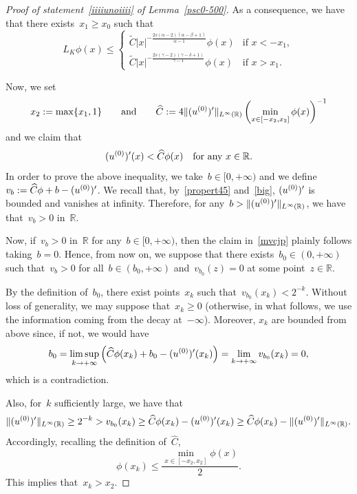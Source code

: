 \documentclass[10pt,a4paper]{amsart}
\numberwithin{equation}{section}
\newcommand{\R}{\mathbb{R}}
\begin{document}
\begin{proof}[Proof of statement~\eqref{iiiiunoiiii} of Lemma~\ref{psc0-500}]
As a consequence, we have that
there exists~$x_1\ge x_0$ such that
\begin{equation}\label{jddo}
{L}_K \phi(x) \leq \begin{cases}
\widetilde{C} |x|^{-\frac{2s(\alpha -2)(\alpha-\beta+1)}{\alpha-1}} \phi(x) &\mbox{if } x < -x_1,\\
\widetilde{C} | x|^{-\frac{2s(\gamma -2)(\gamma-\delta+1)}{\gamma-1}} \phi(x) &\mbox{if } x >x_1.
\end{cases}
\end{equation}

Now, we set 
\begin{equation*}
x_2:= \max\{ x_1,1\} \qquad\mbox{and}\qquad 
\widehat{C} :=4\Vert (u^{(0)})\rq{}\Vert_{L^{\infty}(\R)}  \left(\min_{x \in [-x_2,x_2]}\phi(x)\right)^{-1}
\end{equation*}
and we claim that
\begin{equation}\label{mvcjp}
(u^{(0)})\rq{}(x) <\widehat{C} \phi(x) \quad\mbox{for any } x \in \R.
\end{equation}
In order to prove the above inequality, we take~$b \in [0,+\infty)$ and we define~$v_b:= \widehat{C} \phi +b -(u^{(0)})\rq{}$.
We recall that, by~\eqref{propert45} and~\eqref{big}, $(u^{(0)})\rq{}$ is bounded and vanishes at infinity. Therefore, for any~$b>\Vert (u^{(0)})\rq{}\Vert_{L^{\infty}(\R)}$, we have that~$v_b >0$ in~$\R$.

Now, if~$v_b > 0$ in~$\R$ for any~$b \in [0,+\infty)$, then the claim in~\eqref{mvcjp} plainly follows taking~$b=0$. Hence, from now on, we suppose that there exists~$b_0\in(0,+\infty)$
such that~$v_b>0$ for all~$b\in(b_0,+\infty)$ and~$v_{b_0}(z)=0$ at some point~$z\in\R$.
 
By the definition of~$b_0$, there exist points~$x_k$ such that~$v_{b_0}(x_k)< 2^{-k}$. Without loss of generality, we may suppose that~$x_k\geq 0$ (otherwise,
in what follows, we use the information coming from the decay at~$-\infty$). Moreover, $x_k$ are bounded from above since, if not, we would have
\begin{equation*}
b_0 = \limsup_{k \to +\infty} \left( \widehat{C}\phi(x_k) +b_0 - (u^{(0)})\rq{}(x_k) \right) = \lim_{k \to +\infty} v_{b_0}(x_k) = 0,
\end{equation*}
which is a contradiction. 

Also, for~$k$ sufficiently large, we have that
\begin{equation*}
\Vert (u^{(0)})\rq{}\Vert_{L^{\infty}(\R)} \geq 2^{-k} >v_{b_0}(x_k)\geq \widehat{C} \phi(x_k) -(u^{(0)})\rq{}(x_k) \geq \widehat{C} \phi(x_k) - \Vert (u^{(0)})\rq{}\Vert_{L^{\infty}(\R)}.
\end{equation*}
Accordingly, recalling the definition of~$\widehat{C}$,
\[\phi(x_k) \leq\frac{\min_{x \in [-x_2,x_2]}\phi(x)}{2}.\] 
This implies that~$x_k>x_2$.


\end{proof}
\end{document}
